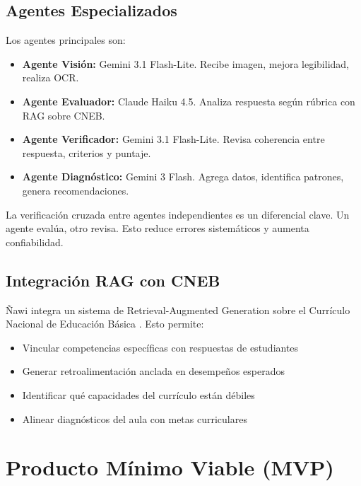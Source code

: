 \documentclass[12pt]{article}
\begin{document}
\subsection{Agentes Especializados}

Los agentes principales son:

\begin{itemize}
    \item \textbf{Agente Visión:} Gemini 3.1 Flash-Lite. Recibe imagen, mejora legibilidad, realiza OCR.
    \item \textbf{Agente Evaluador:} Claude Haiku 4.5. Analiza respuesta según rúbrica con RAG sobre CNEB.
    \item \textbf{Agente Verificador:} Gemini 3.1 Flash-Lite. Revisa coherencia entre respuesta, criterios y puntaje.
    \item \textbf{Agente Diagnóstico:} Gemini 3 Flash. Agrega datos, identifica patrones, genera recomendaciones.
\end{itemize}

La verificación cruzada entre agentes independientes es un diferencial clave. Un agente evalúa, otro revisa. Esto reduce errores sistemáticos y aumenta confiabilidad.

\subsection{Integración RAG con CNEB}

Ñawi integra un sistema de Retrieval-Augmented Generation sobre el Currículo Nacional de Educación Básica \cite{CNEB2016}. Esto permite:

\begin{itemize}
    \item Vincular competencias específicas con respuestas de estudiantes
    \item Generar retroalimentación anclada en desempeños esperados
    \item Identificar qué capacidades del currículo están débiles
    \item Alinear diagnósticos del aula con metas curriculares
\end{itemize}

\section{Producto Mínimo Viable (MVP)}
\end{document}
